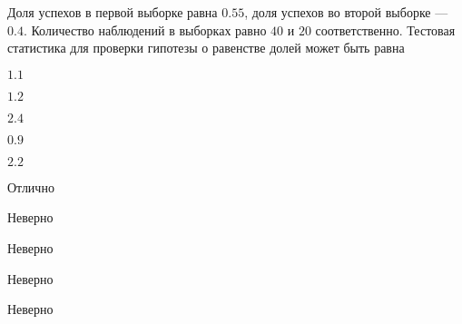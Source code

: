 
\begin{question}
Доля успехов в первой выборке равна \(0.55\), доля успехов во второй
выборке --- \(0.4\). Количество наблюдений в выборках равно \(40\) и
\(20\) соответственно. Тестовая статистика для проверки гипотезы о
равенстве долей может быть равна
\begin{answerlist}
  \item \(1.1\)
  \item \(1.2\)
  \item \(2.4\)
  \item \(0.9\)
  \item \(2.2\)
\end{answerlist}
\end{question}

\begin{solution}
\begin{answerlist}
  \item Отлично
  \item Неверно
  \item Неверно
  \item Неверно
  \item Неверно
\end{answerlist}
\end{solution}

